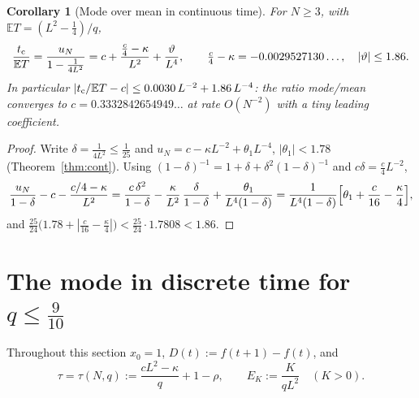 \documentclass[11pt,a4paper]{article}
\newtheorem{corollary}[theorem]{Corollary}
\theoremstyle{definition}
\theoremstyle{remark}
\newcommand{\E}{\mathbb{E}}
\begin{document}
\begin{corollary}[Mode over mean in continuous time]\label{cor:contratio}
For $N\ge3$, with $\E T=(L^2-\frac14)/q$,
\[
  \frac{t_{\rm c}}{\E T}=\frac{u_N}{1-\frac1{4L^2}}=c+\frac{\frac c4-\kappa}{L^2}+\frac{\vartheta}{L^4},\qquad
  \tfrac c4-\kappa=-0.0029527130\ldots,\quad|\vartheta|\le1.86 .
\]
In particular $|t_{\rm c}/\E T-c|\le0.0030\,L^{-2}+1.86\,L^{-4}$: the ratio mode/mean converges to
$c=0.3332842654949\ldots$ at rate $O(N^{-2})$ with a tiny leading coefficient.
\end{corollary}
\begin{proof}
Write $\delta=\frac1{4L^2}\le\frac1{25}$ and $u_N=c-\kappa L^{-2}+\theta_1L^{-4}$, $|\theta_1|<1.78$
(Theorem~\ref{thm:cont}). Using $(1-\delta)^{-1}=1+\delta+\delta^2(1-\delta)^{-1}$ and $c\delta=\frac c4L^{-2}$,
\[
 \frac{u_N}{1-\delta}-c-\frac{c/4-\kappa}{L^2}
 =\frac{c\,\delta^2}{1-\delta}-\frac{\kappa}{L^2}\,\frac{\delta}{1-\delta}+\frac{\theta_1}{L^4(1-\delta)}
 =\frac1{L^4(1-\delta)}\Bigl[\theta_1+\frac c{16}-\frac\kappa4\Bigr],
\]
and $\frac{25}{24}\bigl(1.78+|\frac c{16}-\frac\kappa4|\bigr)<\frac{25}{24}\cdot1.7808<1.86$.
\end{proof}

\section{The mode in discrete time for \texorpdfstring{$q\le\frac9{10}$}{q<=9/10}}\label{sec:discrete}

Throughout this section $x_0=1$, $D(t):=f(t+1)-f(t)$, and
\begin{equation}\label{eq:tau}
  \tau=\tau(N,q):=\frac{cL^2-\kappa}{q}+1-\rho,\qquad E_K:=\frac{K}{qL^2}\quad(K>0).
\end{equation}
\end{document}
